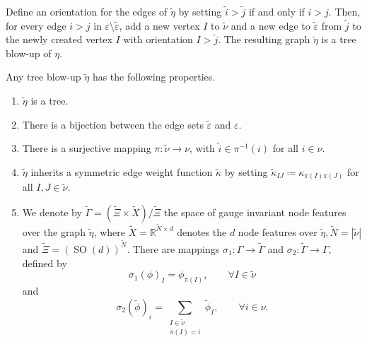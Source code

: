 \documentclass[10pt,reqno]{amsart}
\numberwithin{equation}{section}
\theoremstyle{bfnote}
\theoremstyle{bfdef}
\newcommand{\R}{\mathbb{R}}
\newcommand{\veps}{\varepsilon}
\DeclareMathOperator{\SO}{SO}
\begin{document}
	Define an orientation for the edges of $\tilde\eta$ by setting $\tilde{i} > \tilde{j}$ if and only if $i>j$. Then, for every edge $i>j$ in $\veps \setminus \tilde{\veps}$, add a new vertex $I$ to $\tilde\nu$ and a new edge to $\tilde{\veps}$ from $\tilde{j}$ to the newly created vertex $I$ with orientation $I>\tilde{j}$. The resulting graph $\tilde\eta$ is a tree blow-up of $\eta$.

	Any tree blow-up $\tilde\eta$ has the following properties.
	\begin{enumerate}
		\item $\tilde\eta$ is a tree.

		\item There is a bijection between the edge sets $\tilde\veps$ and $\veps$.

 		\item There is a surjective mapping $\pi:\tilde\nu\to\nu$, with $\tilde{i} \in \pi^{-1}(i)$ for all $i\in\nu$.

		\item $\tilde{\eta}$ inherits a symmetric edge weight function $\tilde{\kappa}$ by setting $\tilde{\kappa}_{IJ}\coloneq\kappa_{\pi(I)\pi(J)}$ for all $I,J \in \tilde{\nu}$.

		\item  We denote by $\tilde{\Gamma} = (\tilde{\Xi} \times \tilde{X}) / \tilde{\Xi}$ the space of gauge invariant node features over the graph $\tilde{\eta}$, where $\tilde{X} = \R^{\tilde{N} \times d}$ denotes the $d$ node features over $\tilde{\eta},\tilde{N} = |\tilde{\nu}|$ and $\tilde{\Xi} = (\SO(d))^{\tilde{N}}$. There are mappings  $\sigma_1 : \Gamma \to \tilde{\Gamma}$ and $\sigma_2 : \tilde{\Gamma} \to \Gamma$, defined by
		\begin{equation}\label{eq:def-sigma-1}
			\sigma_1(\phi)_{I}
			= \phi_{\pi(I)}, \qquad \forall I \in \tilde{\nu}
		\end{equation}
		and
		\begin{equation}\label{eq:def-sigma-2}
			\sigma_2(\tilde{\phi})_i
			= \sum_{\substack{I \in \tilde{\nu} \\  \pi(I) = i}} \tilde{\phi}_I, \qquad \forall i \in \nu.
		\end{equation}
	\end{enumerate}
\end{document}
